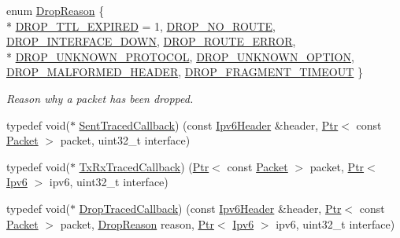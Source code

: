 \begin{DoxyCompactItemize}
\item 
enum \hyperlink{classns3_1_1Ipv6L3Protocol_a33c64db9bc35f71ff368b132bfffa37a}{Drop\+Reason} \{ \\*
\hyperlink{classns3_1_1Ipv6L3Protocol_a33c64db9bc35f71ff368b132bfffa37aa49c4e7173190b1bbba7d6300b06a16ed}{D\+R\+O\+P\+\_\+\+T\+T\+L\+\_\+\+E\+X\+P\+I\+R\+ED} = 1, 
\hyperlink{classns3_1_1Ipv6L3Protocol_a33c64db9bc35f71ff368b132bfffa37aa97de4f69c19b2f94b684448beee892f4}{D\+R\+O\+P\+\_\+\+N\+O\+\_\+\+R\+O\+U\+TE}, 
\hyperlink{classns3_1_1Ipv6L3Protocol_a33c64db9bc35f71ff368b132bfffa37aa72b499545685a47a7cf3588d1330d5d0}{D\+R\+O\+P\+\_\+\+I\+N\+T\+E\+R\+F\+A\+C\+E\+\_\+\+D\+O\+WN}, 
\hyperlink{classns3_1_1Ipv6L3Protocol_a33c64db9bc35f71ff368b132bfffa37aa3690e9264e4d2307050512b833df4946}{D\+R\+O\+P\+\_\+\+R\+O\+U\+T\+E\+\_\+\+E\+R\+R\+OR}, 
\\*
\hyperlink{classns3_1_1Ipv6L3Protocol_a33c64db9bc35f71ff368b132bfffa37aaaf932a981ea33f927add80ea8ed41b05}{D\+R\+O\+P\+\_\+\+U\+N\+K\+N\+O\+W\+N\+\_\+\+P\+R\+O\+T\+O\+C\+OL}, 
\hyperlink{classns3_1_1Ipv6L3Protocol_a33c64db9bc35f71ff368b132bfffa37aa803fe59e441ce2bc53f0fe19df60c14a}{D\+R\+O\+P\+\_\+\+U\+N\+K\+N\+O\+W\+N\+\_\+\+O\+P\+T\+I\+ON}, 
\hyperlink{classns3_1_1Ipv6L3Protocol_a33c64db9bc35f71ff368b132bfffa37aaddfae41b279341b99d46df16e0d4ea7b}{D\+R\+O\+P\+\_\+\+M\+A\+L\+F\+O\+R\+M\+E\+D\+\_\+\+H\+E\+A\+D\+ER}, 
\hyperlink{classns3_1_1Ipv6L3Protocol_a33c64db9bc35f71ff368b132bfffa37aa27ee7f562d7201ffd26f3e08bf620d0a}{D\+R\+O\+P\+\_\+\+F\+R\+A\+G\+M\+E\+N\+T\+\_\+\+T\+I\+M\+E\+O\+UT}
 \}\begin{DoxyCompactList}\small\item\em Reason why a packet has been dropped. \end{DoxyCompactList}
\item 
typedef void($\ast$ \hyperlink{classns3_1_1Ipv6L3Protocol_a15e365bcfa93746691e7acf8a9ef7718}{Sent\+Traced\+Callback}) (const \hyperlink{classns3_1_1Ipv6Header}{Ipv6\+Header} \&header, \hyperlink{classns3_1_1Ptr}{Ptr}$<$ const \hyperlink{classns3_1_1Packet}{Packet} $>$ packet, uint32\+\_\+t interface)
\item 
typedef void($\ast$ \hyperlink{classns3_1_1Ipv6L3Protocol_a5b967a1009f9c57047f135573fd5519f}{Tx\+Rx\+Traced\+Callback}) (\hyperlink{classns3_1_1Ptr}{Ptr}$<$ const \hyperlink{classns3_1_1Packet}{Packet} $>$ packet, \hyperlink{classns3_1_1Ptr}{Ptr}$<$ \hyperlink{classns3_1_1Ipv6}{Ipv6} $>$ ipv6, uint32\+\_\+t interface)
\item 
typedef void($\ast$ \hyperlink{classns3_1_1Ipv6L3Protocol_a9b04d0fb9a344dce07430ba7d90f0995}{Drop\+Traced\+Callback}) (const \hyperlink{classns3_1_1Ipv6Header}{Ipv6\+Header} \&header, \hyperlink{classns3_1_1Ptr}{Ptr}$<$ const \hyperlink{classns3_1_1Packet}{Packet} $>$ packet, \hyperlink{classns3_1_1Ipv6L3Protocol_a33c64db9bc35f71ff368b132bfffa37a}{Drop\+Reason} reason, \hyperlink{classns3_1_1Ptr}{Ptr}$<$ \hyperlink{classns3_1_1Ipv6}{Ipv6} $>$ ipv6, uint32\+\_\+t interface)
\end{DoxyCompactItemize}
